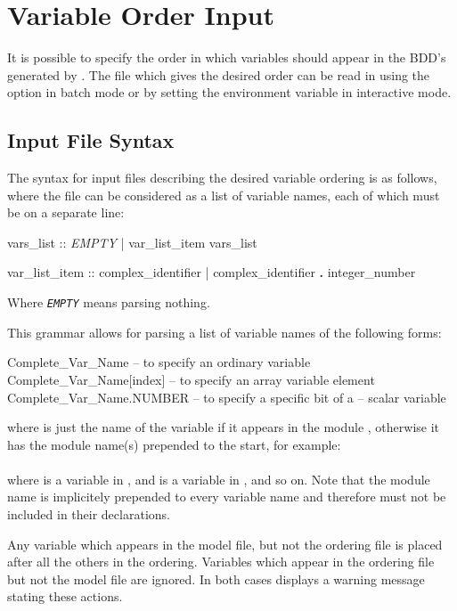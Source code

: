 \section{Variable Order Input}
\label{Variable::Order::Input}
%
It is possible to specify the order in which variables should appear
in the BDD's generated by \nusmv. 
%
The file which gives the desired order can be read in using the
 option in batch mode or by setting the
 environment variable in interactive mode.

\subsection{Input File Syntax}
\label{Input File Syntax}
%
The syntax for input files describing the desired variable ordering is
as follows, where the file can be considered as a list of variable
names, each of which must be on a separate line:
%
\begin{Grammar}
vars_list :: \textit{EMPTY}
         | var_list_item vars_list

var_list_item :: complex_identifier
             | complex_identifier \textbf{.} integer_number
\end{Grammar}
%
Where \textit{\texttt{EMPTY}} means parsing nothing.

This grammar allows for parsing a list of variable names of the
following forms:
%
\begin{nusmvCode}
Complete_Var_Name        -- to specify an ordinary variable
Complete_Var_Name[index] -- to specify an array variable element
Complete_Var_Name.NUMBER -- to specify a specific bit of a
                         -- scalar variable
\end{nusmvCode}
%
where  is just the name of the variable if
it appears in the module , otherwise it has the module
name(s) prepended to the start, for example:\\

\\

\noindent where  is a variable in , and
 is a variable in , and so
on. Note that the module name  is implicitely prepended
to every variable name and therefore must not be included in their
declarations.

\noindent Any variable which appears in the model file, but not the
ordering file is placed after all the others in the
ordering. Variables which appear in the ordering file but not the
model file are ignored. In both cases \nusmv displays a warning
message stating these actions.

